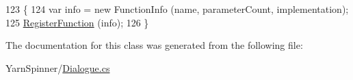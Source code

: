 \begin{DoxyCode}
123                                                                                                \{
124             var info = \textcolor{keyword}{new} FunctionInfo (name, parameterCount, implementation);
125             \hyperlink{a00101_a001ab29d21fe7db10fc9c250914287f9}{RegisterFunction} (info);
126         \}
\end{DoxyCode}


The documentation for this class was generated from the following file\-:\begin{DoxyCompactItemize}
\item 
Yarn\-Spinner/\hyperlink{a00262}{Dialogue.\-cs}\end{DoxyCompactItemize}
